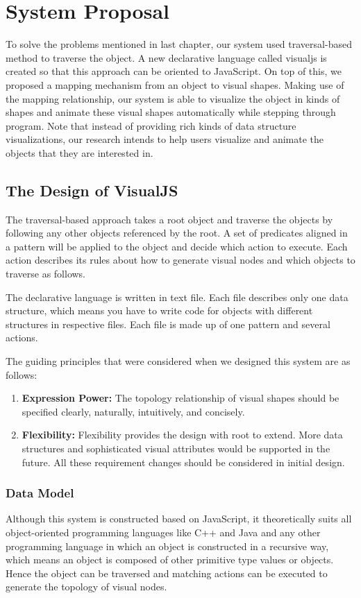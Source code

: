 \chapter {System Proposal}
To solve the problems mentioned in last chapter, our system used traversal-based method \cite{729554} to traverse the object. A new declarative language called visualjs is created so that this approach can be oriented to JavaScript. On top of this, we proposed a mapping mechanism from an object to visual shapes. Making use of the mapping relationship, our system is able to visualize the object in kinds of shapes and animate these visual shapes automatically while stepping through program. Note that instead of providing rich kinds of data structure visualizations, our research intends to help users visualize and animate the objects that they are interested in.

\section {The Design of VisualJS}
The traversal-based approach takes a root object and traverse the objects by following any other objects referenced by the root. A set of predicates aligned in a pattern will be applied to the object and decide which action to execute. Each action describes its rules about how to generate visual nodes and which objects to traverse as follows.

The declarative language is written in text file. Each file describes only one data structure, which means you have to write code for objects with different structures in respective files. Each file is made up of one pattern and several actions.

The guiding principles that were considered when we designed this system are as follows:
\begin {enumerate}
\item \textbf {Expression Power:} The topology relationship of visual shapes should be specified clearly, naturally, intuitively, and concisely.
\item \textbf {Flexibility:} Flexibility provides the design with root to extend. More data structures and sophisticated visual attributes would be supported in the future. All these requirement changes should be considered in initial design. 
\end {enumerate}

\subsection {Data Model}
Although this system is constructed based on JavaScript, it theoretically suits all object-oriented programming languages like C++ and Java and any other programming language in which an object is constructed in a recursive way, which means an object is composed of other primitive type values or objects. Hence the object can be traversed and matching actions can be executed to generate the topology of visual nodes.

